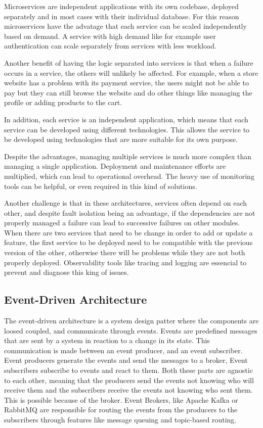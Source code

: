 Microservices are independent applications with its own codebase, deployed
separately and in most cases with their individual database. For this reason
microservices have the advatage that each service can be scaled independently based on demand. A service with
high demand like for example user authentication can scale separately from
services with less workload\cite{8990350}.

Another benefit of having the logic separated into services is that when
a failure occurs in a service, the others will unlikely be affected. For
example, when a store website has a problem with its payment service, the
users might not be able to pay but they can still browse the website and
do other things like managing the profile or adding products to the cart\cite{8990350}.

In addition, each service is an independent application, which means that each service
can be developed using different technologies\cite{7436659}. This allows the service to
be developed using technologies that are more suitable for its own purpose.

Despite the advantages, managing multiple services is much more complex than managing a single
application\cite{newman2019monolith}. Deployment and maintenance efforts are multiplied, which can
lead to operational overhead. The heavy use of monitoring tools can be
helpful, or even required in this kind of solutions.

Another challenge is that in these architectures, services often depend on each other,
and despite fault isolation being an advantage, if the dependencies are not
properly managed a failure can lead to successive failures on other modules.
When there are two services that need to be change in order to add or update
a feature, the first service to be deployed need to be compatible with the
previous version of the other, otherwise there will be problems while they
are not both properly deployed.
Observability tools like tracing and logging are essencial to prevent and
diagnose this king of issues\cite{richards2015software}.

\subsection{Event-Driven Architecture}
The event-driven architecture is a system design patter where the components
are loosed coupled, and communicate through events. Events are predefined
messages that are sent by a system in reaction to a change in its state.
This communication is made between an event producer, and an event subscriber.
Event producers generate the events and send the messages to a broker, Event
subscribers subscribe to events and react to them. Both these parts are agnostic
to each other, meaning that the producers send the events not knowing who will
receive them and the subscribers receive the events not knowing who sent them.
This is possible because of the broker. Event Brokers, like Apache Kafka or
RabbitMQ are responsible for routing the events from the producers to the
subscribers through features like message queuing and topic-based routing\cite{9226286,manchana2021event,AWSEventDriven}.

